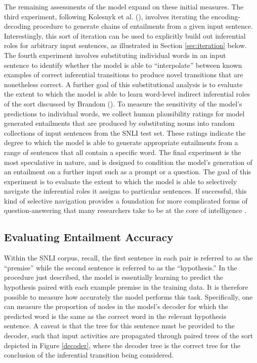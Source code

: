 \documentclass[utf8]{frontiersSCNS} %
\begin{document}
The remaining assessments of the model expand on these initial measures. The third experiment, following Kolesnyk et al. (\citeyear{Kolesnyk:2016}), involves iterating the encoding-decoding procedure to generate chains of entailments from a given input sentence. Interestingly, this sort of iteration can be used to explicitly build out inferential roles for arbitrary input sentences, as illustrated in Section \ref{sec:iteration} below. The fourth experiment involves substituting individual words in an input sentence to identify whether the model is able to ``interpolate'' between known examples of correct inferential transitions to produce novel transitions that are nonetheless correct. A further goal of this substitutional analysis is to evaluate the extent to which the model is able to learn word-level indirect inferential roles of the sort discussed by Brandom (\citeyear{Brandom:1994}). To measure the sensitivity of the model's predictions to individual words, we collect human plausibility ratings for model generated entailments that are produced by substituting nouns into random collections of input sentences from the SNLI test set. These ratings indicate the degree to which the model is able to generate appropriate entailments from a range of sentences that all contain a specific word. The final experiment is the most speculative in nature, and is designed to condition the model's generation of an entailment on a further input such as a prompt or a question. The goal of this experiment is to evaluate the extent to which the model is able to selectively navigate the inferential roles it assigns to particular sentences. If successful, this kind of selective navigation provides a foundation for more complicated forms of question-answering that many researchers take to be at the core of intelligence \citep{Weston:2015,Weston:2016}. 

\subsection{Evaluating Entailment Accuracy}

Within the SNLI corpus, recall, the first sentence in each pair is referred to as the ``premise'' while the second sentence is referred to as the ``hypothesis.'' In the procedure just described, the model is essentially learning to predict the hypothesis paired with each example premise in the training data. It is therefore possible to measure how accurately the model performs this task. Specifically, one can measure the proportion of nodes in the model's decoder for which the predicted word is the same as the correct word in the relevant hypothesis sentence. A caveat is that the tree for this sentence must be provided to the decoder, such that input activities are propagated through paired trees of the sort depicted in Figure \ref{decoder}, where the decoder tree is the correct tree for the conclusion of the inferential transition being considered.
\end{document}
